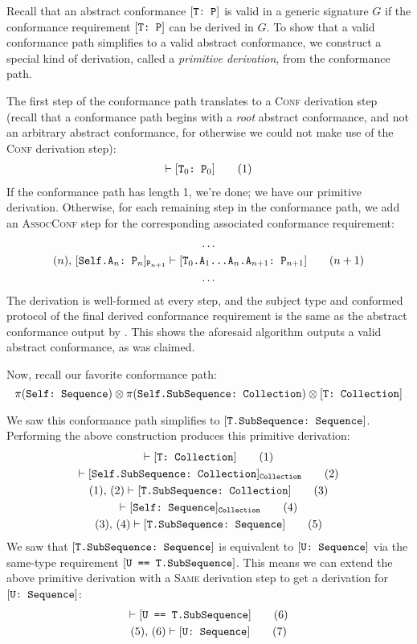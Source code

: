 \documentclass[../generics]{subfiles}
\begin{document}
Recall that an abstract conformance $[\texttt{T:~P}]$ is valid in a generic signature $G$ if the conformance requirement $[\texttt{T:~P}]$ can be derived in $G$. To show that a valid conformance path simplifies to a valid abstract conformance, we construct a special kind of derivation, called a \emph{primitive derivation}, from the conformance path.

The first step of the conformance path translates to a \textsc{Conf} derivation step (recall that a conformance path begins with a \emph{root} abstract conformance, and not an arbitrary abstract conformance, for otherwise we could not make use of the \textsc{Conf} derivation step):
\begin{gather*}
\vdash[\texttt{$\texttt{T}_0$:~$\texttt{P}_0$}]\tag{1}
\end{gather*}
If the conformance path has length 1, we're done; we have our primitive derivation. Otherwise, for each remaining step in the conformance path, we add an \textsc{AssocConf} step for the corresponding associated conformance requirement:
\begin{gather*}
\ldots\\
(n),\,[\texttt{Self.$\texttt{A}_n$:~$\texttt{P}_n$}]_{\texttt{P}_{n+1}}\vdash[\texttt{$\texttt{T}_0$.$\texttt{A}_1$...$\texttt{A}_{n}$.$\texttt{A}_{n+1}$:~$\texttt{P}_{n+1}$}]\tag{$n+1$}\\
\ldots
\end{gather*}
The derivation is well-formed at every step, and the subject type and conformed protocol of the final derived conformance requirement is the same as the abstract conformance output by . This shows the aforesaid algorithm outputs a valid abstract conformance, as was claimed.

Now, recall our favorite conformance path:
\[\pi(\texttt{Self:~Sequence}) \otimes \pi(\texttt{Self.SubSequence:~Collection}) \otimes [\texttt{T:~Collection}]\]

We saw this conformance path simplifies to $[\texttt{T.SubSequence:~Sequence}]$. Performing the above construction produces this primitive derivation:
\begin{gather*}
\vdash[\texttt{T:~Collection}]\tag{1}\\
\vdash[\texttt{Self.SubSequence:~Collection}]_\texttt{Collection}\tag{2}\\
(1),\,(2)\vdash[\texttt{T.SubSequence:~Collection}]\tag{3}\\
\vdash[\texttt{Self:~Sequence}]_\texttt{Collection}\tag{4}\\
(3),\,(4)\vdash[\texttt{T.SubSequence:~Sequence}]\tag{5}
\end{gather*}
We saw that $[\texttt{T.SubSequence:~Sequence}]$ is equivalent to $[\texttt{U:~Sequence}]$ via the same-type requirement $[\texttt{U == T.SubSequence}]$. This means we can extend the above primitive derivation with a \textsc{Same} derivation step to get a derivation for $[\texttt{U:~Sequence}]$:
\begin{gather*}
\vdash[\texttt{U == T.SubSequence}]\tag{6}\\
(5),\,(6)\vdash[\texttt{U:~Sequence}]\tag{7}
\end{gather*}
\end{document}
